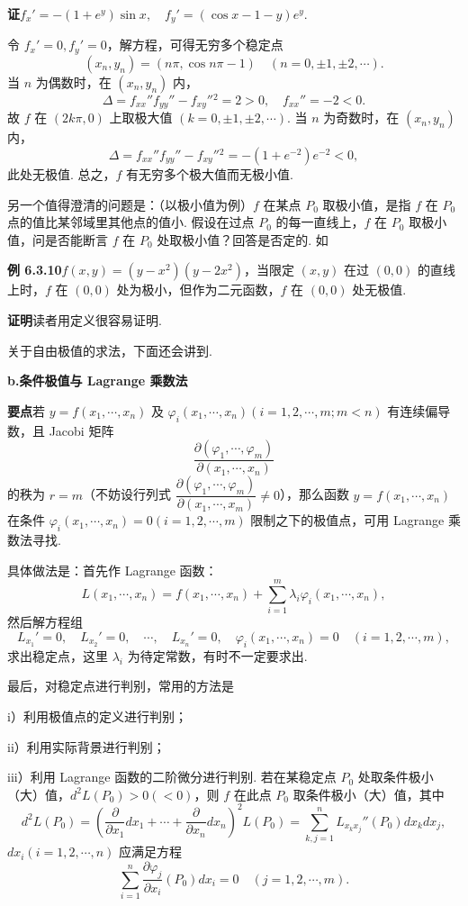 \documentclass[UTF8,12pt,a4paper,fontset=fandol]{ctexart}
\begin{document}
\noindent\textbf{证}\quad $f_x'=-(1+e^y)\sin x,\quad f_y'=(\cos x-1-y)e^y$.

令 $f_x'=0,f_y'=0$，解方程，可得无穷多个稳定点
\[
  (x_n,y_n)=(n\pi,\cos n\pi-1)\quad(n=0,\pm1,\pm2,\cdots).
\]
当 $n$ 为偶数时，在 $(x_n,y_n)$ 内，
\[
  \Delta=f_{xx}''f_{yy}''-f_{xy}''{}^2=2>0,\quad f_{xx}''=-2<0.
\]
故 $f$ 在 $(2k\pi,0)$ 上取极大值 $(k=0,\pm1,\pm2,\cdots)$. 当 $n$ 为奇数时，在 $(x_n,y_n)$ 内，
\[
  \Delta=f_{xx}''f_{yy}''-f_{xy}''{}^2=-(1+e^{-2})e^{-2}<0,
\]
此处无极值. 总之，$f$ 有无穷多个极大值而无极小值.

另一个值得澄清的问题是：（以极小值为例）$f$ 在某点 $P_0$ 取极小值，是指 $f$ 在 $P_0$ 点的值比某邻域里其他点的值小. 假设在过点 $P_0$ 的每一直线上，$f$ 在 $P_0$ 取极小值，问是否能断言 $f$ 在 $P_0$ 处取极小值？回答是否定的. 如

\noindent\textbf{例 6.3.10}\quad $f(x,y)=(y-x^2)(y-2x^2)$，当限定 $(x,y)$ 在过 $(0,0)$ 的直线上时，$f$ 在 $(0,0)$ 处为极小，但作为二元函数，$f$ 在 $(0,0)$ 处无极值.

\noindent\textbf{证明}\quad 读者用定义很容易证明.

关于自由极值的求法，下面还会讲到.

\noindent\textbf{b.\quad 条件极值与 Lagrange 乘数法}

\noindent\textbf{要点}\quad 若 $y=f(x_1,\cdots,x_n)$ 及 $\varphi_i(x_1,\cdots,x_n)(i=1,2,\cdots,m;m<n)$ 有连续偏导数，且 Jacobi 矩阵
\[
  \frac{\partial(\varphi_1,\cdots,\varphi_m)}{\partial(x_1,\cdots,x_n)}
\]
的秩为 $r=m$（不妨设行列式 $\dfrac{\partial(\varphi_1,\cdots,\varphi_m)}{\partial(x_1,\cdots,x_m)}\ne0$），那么函数 $y=f(x_1,\cdots,x_n)$ 在条件 $\varphi_i(x_1,\cdots,x_n)=0(i=1,2,\cdots,m)$ 限制之下的极值点，可用 Lagrange 乘数法寻找.

具体做法是：首先作 Lagrange 函数：
\[
  L(x_1,\cdots,x_n)=f(x_1,\cdots,x_n)+\sum_{i=1}^{m}\lambda_i\varphi_i(x_1,\cdots,x_n),
\]
然后解方程组
\[
  L_{x_1}'=0,\quad L_{x_2}'=0,\quad\cdots,\quad L_{x_n}'=0,\quad
  \varphi_i(x_1,\cdots,x_n)=0\quad(i=1,2,\cdots,m),
\]
求出稳定点，这里 $\lambda_i$ 为待定常数，有时不一定要求出.

最后，对稳定点进行判别，常用的方法是

i）利用极值点的定义进行判别；

ii）利用实际背景进行判别；

iii）利用 Lagrange 函数的二阶微分进行判别. 若在某稳定点 $P_0$ 处取条件极小（大）值，$d^2L(P_0)>0(<0)$，则 $f$ 在此点 $P_0$ 取条件极小（大）值，其中
\[
  d^2L(P_0)=
  \left(\frac{\partial}{\partial x_1}dx_1+\cdots+
  \frac{\partial}{\partial x_n}dx_n\right)^2L(P_0)
  =\sum_{k,j=1}^{n}L_{x_kx_j}''(P_0)dx_kdx_j,
\]
$dx_i(i=1,2,\cdots,n)$ 应满足方程
\[
  \sum_{i=1}^{n}\frac{\partial\varphi_j}{\partial x_i}(P_0)dx_i=0
  \quad(j=1,2,\cdots,m).
\]
\end{document}
